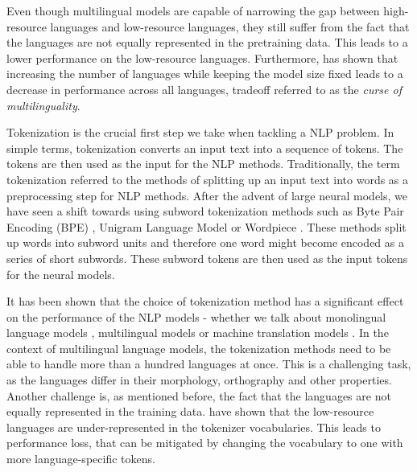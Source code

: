 Even though multilingual models are capable of narrowing the gap between high-resource languages and low-resource languages, they still suffer from the fact that the languages are not equally represented in the pretraining data. This leads to a lower performance on the low-resource languages. \cite{conneau_unsupervised_2020} Furthermore,  has shown that increasing the number of languages while keeping the model size fixed leads to a decrease in performance across all languages, tradeoff referred to as the \textit{curse of multilinguality}. \cite{conneau_unsupervised_2020}

Tokenization is the crucial first step we take when tackling a NLP problem. In simple terms, tokenization converts an input text into a sequence of tokens. The tokens are then used as the input for the NLP methods. Traditionally, the term tokenization referred to the methods of splitting up an input text into words as a preprocessing step for NLP methods. After the advent of large neural models, we have seen a shift towards using subword tokenization methods such as Byte Pair Encoding (BPE) \cite{sennrich_neural_2016}, Unigram Language Model \cite{kudo_sentencepiece_2018} or Wordpiece \cite{devlin_bert_2019}. These methods split up words into subword units and therefore one word might become encoded as a series of short subwords. These subword tokens are then used as the input tokens for the neural models.

It has been shown that the choice of tokenization method has a significant effect on the performance of the NLP models - whether we talk about monolingual language models \cite{bostrom_byte_2020}, multilingual models \cite{rust_how_2021} or machine translation models \cite{kudo_sentencepiece_2018,gowda_finding_2020}. In the context of multilingual language models, the tokenization methods need to be able to handle more than a hundred languages at once. This is a challenging task, as the languages differ in their morphology, orthography and other properties. Another challenge is, as mentioned before, the fact that the languages are not equally represented in the training data.  have shown that the low-resource languages are under-represented in the tokenizer vocabularies. This leads to performance loss, that can be mitigated by changing the vocabulary to one with more language-specific tokens. \cite{rust_how_2021}

